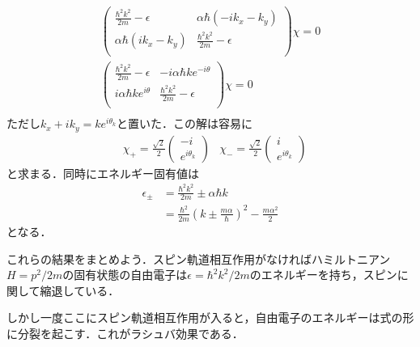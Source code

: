 \documentclass[a4j]{jarticle}
\begin{document}

\begin{align*}
 \begin{pmatrix}
  \frac{\hbar^2k^2}{2m}-\epsilon & \alpha\hbar (-ik_x-k_y) \\
  \alpha\hbar (ik_x-k_y)&\frac{\hbar^2k^2}{2m}-\epsilon    \\
 \end{pmatrix}
 \chi =0 \\
 \begin{pmatrix}
  \frac{\hbar^2k^2}{2m}-\epsilon & -i\alpha\hbar ke^{-i\theta} \\
  i\alpha\hbar ke^{i\theta}      &\frac{\hbar^2k^2}{2m}-\epsilon    \\
 \end{pmatrix}
 \chi =0 \\
\end{align*}
ただし$k_x+ik_y=ke^{i\theta_k}$と置いた．この解は容易に
\begin{align*}
 &\chi_+=\frac{\sqrt{2}}{2}
\begin{pmatrix}
 -i \\
 e^{i\theta_k}
\end{pmatrix}
&\chi_-=\frac{\sqrt{2}}{2}
\begin{pmatrix}
 i \\
 e^{i\theta_k}
\end{pmatrix}
\end{align*}
と求まる．同時にエネルギー固有値は
\begin{align*}
 \epsilon_{\pm}&=\frac{\hbar^2k^2}{2m}\pm \alpha\hbar k \\
  &=\frac{\hbar^2}{2m}\left(k\pm \frac{m\alpha}{\hbar}\right)^2-\frac{m\alpha^2}{2}
\end{align*}
となる．

これらの結果をまとめよう．スピン軌道相互作用がなければハミルトニアン$H=p^2/2m$の固有状態の自由電子は$\epsilon=\hbar^2k^2/2m$のエネルギーを持ち，スピンに関して縮退している．

しかし一度ここにスピン軌道相互作用が入ると，自由電子のエネルギーは式の形に分裂を起こす．これがラシュバ効果である．
\end{document}
